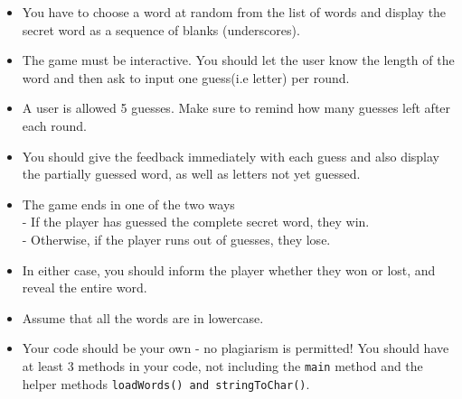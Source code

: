 \documentclass[12pt]{article}
\begin{document}
\begin{itemize}
	\item You have to choose a word at random from the list of words and display the secret word as a sequence of blanks (underscores). 
	\item The game must be interactive. You should let the user know the length of the word and then ask to input one guess(i.e letter) per round.
	\item A user is allowed 5 guesses. Make sure to remind how many guesses left after each round.
	\item You should give the feedback immediately with each guess and also display the partially guessed word, as well as letters not yet guessed.
	\item The game ends in one of the two ways\\
	- If the player has guessed the complete secret word, they win.\\
	- Otherwise, if the player runs out of guesses, they lose.
	\item In either case, you should inform the player whether they won or lost, and reveal the entire word.
	\item Assume that all the words are in lowercase.
	\item Your code should be your own - no plagiarism is permitted! You should have at least 3 methods in your code, not including the \texttt{main} method and the helper methods \texttt{loadWords() and stringToChar()}.
\end{itemize}
\end{document}
